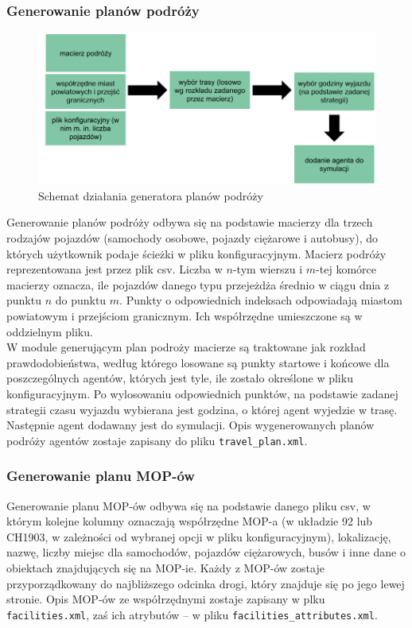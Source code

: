 \subsubsection{Generowanie planów podróży}
    \begin{figure}[h]
        \caption{Schemat działania generatora planów podróży}
        \includegraphics[width=\textwidth]{images/mopsim/mopsim-travelplan.png}
    \end{figure}
Generowanie planów podróży odbywa się na podstawie macierzy dla trzech rodzajów pojazdów (samochody osobowe, pojazdy ciężarowe i autobusy), do których użytkownik podaje ścieżki w pliku konfiguracyjnym. Macierz podróży reprezentowana jest przez plik csv. Liczba w $n$-tym wierszu i $m$-tej komórce macierzy oznacza, ile pojazdów danego typu przejeżdża średnio w ciągu dnia z punktu $n$ do punktu $m$. Punkty o odpowiednich indeksach odpowiadają miastom powiatowym i przejściom granicznym. Ich współrzędne umieszczone są w oddzielnym pliku.\\
W module generującym plan podroży macierze są traktowane jak rozkład prawdodobieństwa, według którego losowane są punkty startowe i końcowe dla poszczególnych agentów, których jest tyle, ile zostało określone w pliku konfiguracyjnym. Po wylosowaniu odpowiednich punktów, na podstawie zadanej strategii czasu wyjazdu wybierana jest godzina, o której agent wyjedzie w trasę. Następnie agent dodawany jest do symulacji. Opis wygenerowanych planów podróży agentów zostaje zapisany do pliku \texttt{travel\_plan.xml}.
\newpage
\subsubsection{Generowanie planu MOP-ów}
Generowanie planu MOP-ów odbywa się na podstawie danego pliku csv, w którym kolejne kolumny oznaczają współrzędne MOP-a (w układzie 92 lub CH1903, w zależności od wybranej opcji w pliku konfiguracyjnym), lokalizację, nazwę, liczby miejsc dla samochodów, pojazdów ciężarowych, busów i inne dane o obiektach znajdujących się na MOP-ie. Każdy z MOP-ów zostaje przyporządkowany do najbliższego odcinka drogi, który znajduje się po jego lewej stronie. Opis MOP-ów ze współrzędnymi zostaje zapisany w plku \texttt{facilities.xml}, zaś ich atrybutów -- w pliku \texttt{facilities\_attributes.xml}.

